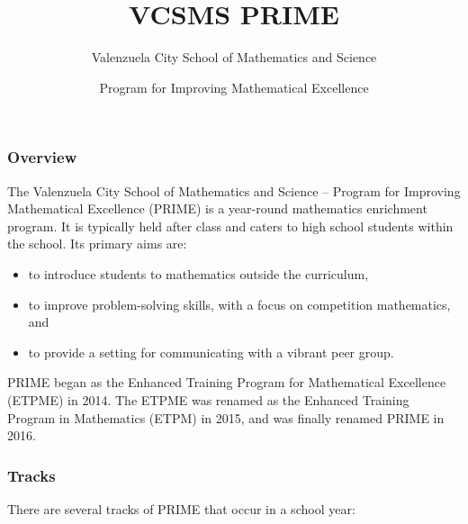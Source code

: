 \documentclass[10pt,paper=letter]{scrartcl}
\begin{document}
\title{VCSMS PRIME}
\author{Valenzuela City School of Mathematics and Science}
\date{Program for Improving Mathematical Excellence}

\maketitle

\subsubsection*{Overview}

The Valenzuela City School of Mathematics and Science -- Program for Improving Mathematical Excellence (PRIME) is a year-round mathematics enrichment program. It is typically held after class and caters to high school students within the school. Its primary aims are:

\begin{itemize}

\item to introduce students to mathematics outside the curriculum,

\item to improve problem-solving skills, with a focus on competition mathematics, and

\item to provide a setting for communicating with a vibrant peer group.

\end{itemize}

PRIME began as the Enhanced Training Program for Mathematical Excellence (ETPME) in 2014. The ETPME was renamed as the Enhanced Training Program in Mathematics (ETPM) in 2015, and was finally renamed PRIME in 2016.

\subsubsection*{Tracks}

There are several tracks of PRIME that occur in a school year:
\end{document}
